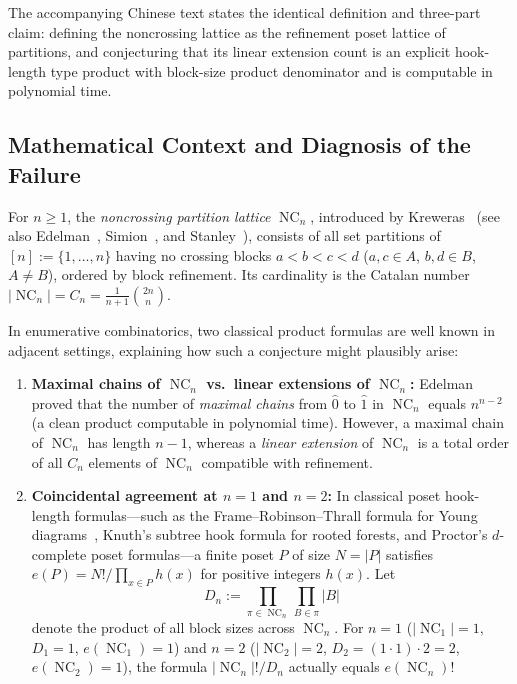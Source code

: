 \documentclass[11pt]{article}
\theoremstyle{definition}
\newcommand{\NC}{\operatorname{NC}}
\begin{document}
The accompanying Chinese text states the identical definition and three-part claim:
defining the noncrossing lattice as the refinement poset lattice of partitions, and
conjecturing that its linear extension count is an explicit hook-length type product
with block-size product denominator and is computable in polynomial time.

\subsection*{Mathematical Context and Diagnosis of the Failure}

For $n \ge 1$, the \emph{noncrossing partition lattice} $\NC_n$, introduced by
Kreweras~\cite{Kreweras1972} (see also Edelman~\cite{Edelman1980}, Simion~\cite{Simion2000},
and Stanley~\cite{StanleyEC1}), consists of all set partitions of $[n] := \{1, \dots, n\}$
having no crossing blocks $a < b < c < d$ ($a, c \in A$, $b, d \in B$, $A \ne B$),
ordered by block refinement. Its cardinality is the Catalan number
$|\NC_n| = C_n = \frac{1}{n+1}\binom{2n}{n}$.

In enumerative combinatorics, two classical product formulas are well known in adjacent
settings, explaining how such a conjecture might plausibly arise:
\begin{enumerate}
  \item \textbf{Maximal chains of $\NC_n$ vs.\ linear extensions of $\NC_n$:}
  Edelman~\cite{Edelman1980} proved that the number of \emph{maximal chains} from
  $\hat{0}$ to $\hat{1}$ in $\NC_n$ equals $n^{n-2}$ (a clean product computable in
  polynomial time). However, a maximal chain of $\NC_n$ has length $n - 1$, whereas a
  \emph{linear extension} of $\NC_n$ is a total order of all $C_n$ elements of $\NC_n$
  compatible with refinement.
  \item \textbf{Coincidental agreement at $n = 1$ and $n = 2$:}
  In classical poset hook-length formulas---such as the Frame--Robinson--Thrall formula
  for Young diagrams~\cite{FRT1954}, Knuth's subtree hook formula for rooted forests, and
  Proctor's $d$-complete poset formulas---a finite poset $P$ of size $N = |P|$ satisfies
  $e(P) = N! / \prod_{x \in P} h(x)$ for positive integers $h(x)$. Let
  \[
    D_n := \prod_{\pi \in \NC_n} \prod_{B \in \pi} |B|
  \]
  denote the product of all block sizes across $\NC_n$. For $n = 1$ ($|\NC_1| = 1$,
  $D_1 = 1$, $e(\NC_1) = 1$) and $n = 2$ ($|\NC_2| = 2$, $D_2 = (1 \cdot 1) \cdot 2 = 2$,
  $e(\NC_2) = 1$), the formula $|\NC_n|! / D_n$ actually equals $e(\NC_n)$!
\end{enumerate}
\end{document}
